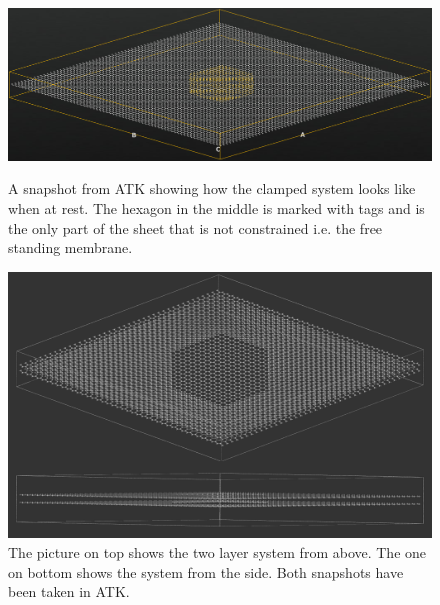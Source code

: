 \onecolumngrid

\begin{figure}[H]
    \centering
    \includegraphics[width=\columnwidth]{Figures/NanoLayer5nm.png}
    \caption{A snapshot from ATK\cite{QuantumWise} showing how the clamped system looks like when at rest. The hexagon in the middle is marked with tags and is the only part of the sheet that is not constrained i.e. the free standing membrane.}
    \label{fig:clamped}
\vspace{12em}
    \centering
    \includegraphics[width=\columnwidth]{Figures/DoubleMembrane.png}
\caption{The picture on top shows the two layer system from above. The one on bottom shows the system from the side. Both snapshots have been taken in ATK\cite{QuantumWise}.}
\label{interlayersys}
\end{figure}
\twocolumngrid
